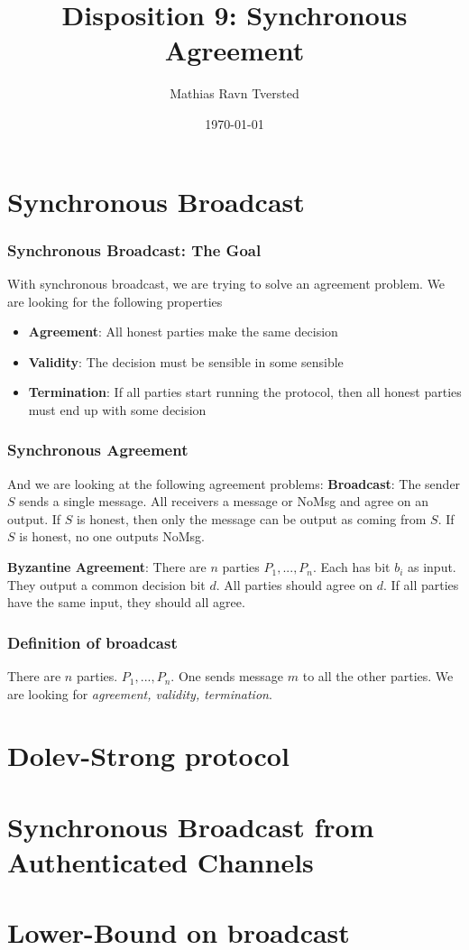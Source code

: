 \documentclass[14pt]{beamer}
\title{Disposition 9: Synchronous Agreement}
\author{Mathias Ravn Tversted}
\date{\today}
\begin{document}
\frame{\titlepage} 



\section{Synchronous Broadcast}
    \begin{frame}
        \frametitle{Synchronous Broadcast: The Goal}
            With synchronous broadcast, we are trying to solve an agreement problem. We are looking for the following properties
            \begin{itemize}
                \item \textbf{Agreement}: All honest parties make the same decision
                \item \textbf{Validity}: The decision must be sensible in some sensible
                \item \textbf{Termination}: If all parties start running the protocol, then all honest parties must end up with some decision
            \end{itemize}
    \end{frame}
\begin{frame}
    \frametitle{Synchronous Agreement}  
        And we are looking at the following agreement problems:
        \textbf{Broadcast}: The sender $S$ sends a single message. All receivers a message or NoMsg and agree on an output. If $S$ is honest, then only the message can be output as coming from $S$. If $S$ is honest, no one outputs NoMsg. 
        
        \textbf{Byzantine Agreement}: There are $n$ parties $P_1, ..., P_n$. Each has bit $b_i$ as input. They output a common decision bit $d$. All parties should agree on $d$. If all parties have the same input, they should all agree. 
\end{frame}

    \begin{frame}
        \frametitle{Definition of broadcast}
            There are $n$ parties. $P_1, ..., P_n$. One sends message $m$ to all the other parties. We are looking for \textit{agreement, validity, termination}. 
    \end{frame}


\section{Dolev-Strong protocol}


\section{Synchronous Broadcast from Authenticated Channels}


\section{Lower-Bound on broadcast}
\end{document}
